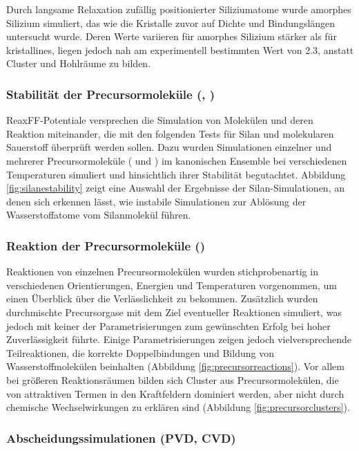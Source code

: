 Durch langsame Relaxation zufällig positionierter Siliziumatome wurde amorphes Silizium simuliert, das wie die Kristalle zuvor auf Dichte und Bindungslängen untersucht wurde.
Deren Werte variieren für amorphes Silizium stärker als für kristallines, liegen jedoch nah am experimentell bestimmten Wert von \SI{2.3}{\gpcc}\cite{remes_optical_1998}, anstatt Cluster und Hohlräume zu bilden.

\subsubsection{Stabilität der Precursormoleküle (, )}

ReaxFF-Potentiale versprechen die Simulation von Molekülen und deren Reaktion miteinander, die mit den folgenden Tests für Silan und molekularen Sauerstoff überprüft werden sollen.
Dazu wurden Simulationen einzelner und mehrerer Precursormoleküle ( und ) im kanonischen Ensemble bei verschiedenen Temperaturen simuliert und hinsichtlich ihrer Stabilität begutachtet.
Abbildung \ref{fig:silanestability} zeigt eine Auswahl der Ergebnisse der Silan-Simulationen, an denen sich erkennen lässt, wie instabile Simulationen zur Ablösung der Wasserstoffatome vom Silanmolekül führen.

\subsubsection{Reaktion der Precursormoleküle ()}

Reaktionen von einzelnen Precursormolekülen wurden stichprobenartig in verschiedenen Orientierungen, Energien und Temperaturen vorgenommen, um einen Überblick über die Verlässlichkeit zu bekommen.
Zusätzlich wurden durchmischte Precursorgase mit dem Ziel eventueller Reaktionen simuliert, was jedoch mit keiner der Parametrisierungen zum gewünschten Erfolg bei hoher Zuverlässigkeit führte.
Einige Parametrisierungen zeigen jedoch vielversprechende Teilreaktionen, die korrekte Doppelbindungen und Bildung von Wasserstoffmolekülen beinhalten (Abbildung \ref{fig:precursorreactions}).
Vor allem bei größeren Reaktionsräumen bilden sich Cluster aus Precursormolekülen, die von attraktiven Termen in den Kraftfeldern dominiert werden, aber nicht durch chemische Wechselwirkungen zu erklären sind (Abbildung \ref{fig:precursorclusters}).

\subsubsection{Abscheidungssimulationen (PVD, CVD)}

